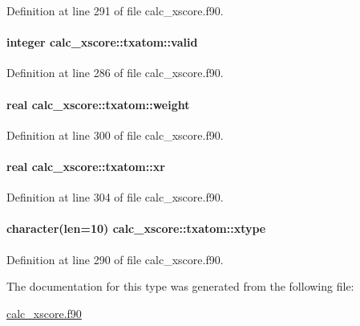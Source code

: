 Definition at line 291 of file calc\-\_\-xscore.\-f90.

\hypertarget{structcalc__xscore_1_1txatom_ae5a4b038ba33facfd03a4bc74136cbcc}{
\paragraph[{valid}]{\setlength{\rightskip}{0pt plus 5cm}integer calc\-\_\-xscore\-::txatom\-::valid}}\label{structcalc__xscore_1_1txatom_ae5a4b038ba33facfd03a4bc74136cbcc}


Definition at line 286 of file calc\-\_\-xscore.\-f90.

\hypertarget{structcalc__xscore_1_1txatom_a4949f0dbec8135427d1b46711b88e0e5}{
\paragraph[{weight}]{\setlength{\rightskip}{0pt plus 5cm}real calc\-\_\-xscore\-::txatom\-::weight}}\label{structcalc__xscore_1_1txatom_a4949f0dbec8135427d1b46711b88e0e5}


Definition at line 300 of file calc\-\_\-xscore.\-f90.

\hypertarget{structcalc__xscore_1_1txatom_a182137748f9b4a83a04eabc9dcd1a4ef}{
\paragraph[{xr}]{\setlength{\rightskip}{0pt plus 5cm}real calc\-\_\-xscore\-::txatom\-::xr}}\label{structcalc__xscore_1_1txatom_a182137748f9b4a83a04eabc9dcd1a4ef}


Definition at line 304 of file calc\-\_\-xscore.\-f90.

\hypertarget{structcalc__xscore_1_1txatom_a926309293c7f104d3d91626293003e2c}{
\paragraph[{xtype}]{\setlength{\rightskip}{0pt plus 5cm}character(len=10) calc\-\_\-xscore\-::txatom\-::xtype}}\label{structcalc__xscore_1_1txatom_a926309293c7f104d3d91626293003e2c}


Definition at line 290 of file calc\-\_\-xscore.\-f90.



The documentation for this type was generated from the following file\-:\begin{DoxyCompactItemize}
\item 
\hyperlink{calc__xscore_8f90}{calc\-\_\-xscore.\-f90}\end{DoxyCompactItemize}
